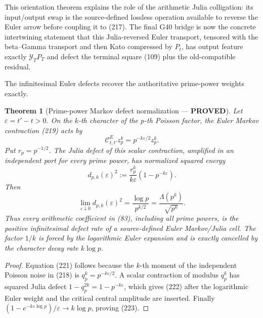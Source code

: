 \documentclass[11pt]{article}
\newtheorem{theorem}{Theorem}
\newcommand{\PROVED}{\textcolor{green!45!black}{\textbf{PROVED}}}
\begin{document}
This orientation theorem explains the role of the arithmetic Julia
colligation: its input/output swap is the source-defined lossless operation
available to reverse the Euler arrow before coupling it to (217).  The final
G40 bridge is now the concrete intertwining statement that this Julia-reversed
Euler transport, tensored with the beta--Gamma transport and then Kato
compressed by $P_t$, has output feature exactly $\mathcal Y_TP_T$ and defect
the terminal square (109) plus the old-compatible residual.

The infinitesimal Euler defects recover the authoritative prime-power weights
exactly.

\begin{theorem}[Prime-power Markov defect normalization --- \PROVED]
Let $\varepsilon=t'-t>0$.  On the $k$-th character of the $p$-th Poisson
factor, the Euler Markov contraction (219) acts by
\begin{equation}
 \mathcal C^E_{t,t'}z_p^k
 =p^{-k\varepsilon/2}z_p^k.                           \tag{221}
\end{equation}
Put $r_p=p^{-1/2}$.  The Julia defect of this scalar contraction, amplified
in an independent port for every prime power, has normalized squared energy
\begin{equation}
 d_{p,k}(\varepsilon)^2
 :=\frac{r_p^k}{k\varepsilon}
       \left(1-p^{-k\varepsilon}\right).             \tag{222}
\end{equation}
Then
\begin{equation}
 \lim_{\varepsilon\downarrow0}d_{p,k}(\varepsilon)^2
 =\frac{\log p}{p^{k/2}}
 =\frac{\Lambda(p^k)}{\sqrt{p^k}}.                  \tag{223}
\end{equation}
Thus every arithmetic coefficient in (83), including all prime powers, is
the positive infinitesimal defect rate of a source-defined Euler Markov/Julia
cell.  The factor $1/k$ is forced by the logarithmic Euler expansion and is
exactly cancelled by the character decay rate $k\log p$.
\end{theorem}

\begin{proof}
Equation (221) follows because the $k$-th moment of the independent Poisson
noise in (218) is $q_p^k=p^{-k\varepsilon/2}$.  A scalar contraction of
modulus $q_p^k$ has squared Julia defect $1-q_p^{2k}=1-p^{-k\varepsilon}$,
which gives (222) after the logarithmic Euler weight and the critical central
amplitude are inserted.  Finally
$(1-e^{-k\varepsilon\log p})/\varepsilon\to k\log p$,
proving (223).
\end{proof}
\end{document}
